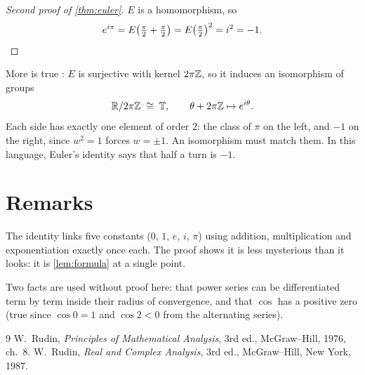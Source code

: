 \documentclass[11pt,a4paper]{article}
\begin{document}
\begin{proof}[Second proof of \cref{thm:euler}]
  $E$ is a homomorphism, so
  \[
    e^{i\pi} = E\bigl(\tfrac\pi2 + \tfrac\pi2\bigr) = E\bigl(\tfrac\pi2\bigr)^2
    = i^2 = -1. \qedhere
  \]
\end{proof}

\begin{remark}
  More is true \cite[Prologue]{rudin-rca}: $E$ is surjective with kernel $2\pi\mathbb{Z}$,
  so it induces an isomorphism of groups
  \[
    \mathbb{R} / 2\pi\mathbb{Z} \;\cong\; \mathbb{T}, \qquad \theta + 2\pi\mathbb{Z} \mapsto e^{i\theta}.
  \]
  Each side has exactly one element of order $2$: the class of $\pi$ on the left, and
  $-1$ on the right, since $w^2 = 1$ forces $w = \pm 1$. An isomorphism must match
  them. In this language, Euler's identity says that half a turn is $-1$.
\end{remark}

\section{Remarks}

\begin{remark}
  The identity links five constants ($0$, $1$, $e$, $i$, $\pi$) using
  addition, multiplication and exponentiation exactly once each. The proof
  shows it is less mysterious than it looks: it is \cref{lem:formula} at a
  single point.
\end{remark}

\begin{remark}
  Two facts are used without proof here: that power series can be
  differentiated term by term inside their radius of convergence, and that
  $\cos$ has a positive zero (true since $\cos 0 = 1$ and $\cos 2 < 0$ from
  the alternating series).
\end{remark}

\begin{thebibliography}{9}
   W.~Rudin, \emph{Principles of Mathematical Analysis},
    3rd ed., McGraw--Hill, 1976, ch.~8.
   W.~Rudin, \emph{Real and Complex Analysis}, 3rd ed.,
    McGraw--Hill, New York, 1987.
\end{thebibliography}
\end{document}
